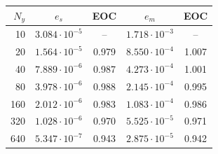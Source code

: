 \begin{tabular}{rcccc}
\toprule
$N_y$ & $e_s$ & EOC & $e_m$ & EOC \\
\midrule
10 & $3.084 \cdot 10^{-5}$ & -- & $1.718 \cdot 10^{-3}$ & -- \\
20 & $1.564 \cdot 10^{-5}$ & 0.979 & $8.550 \cdot 10^{-4}$ & 1.007 \\
40 & $7.889 \cdot 10^{-6}$ & 0.987 & $4.273 \cdot 10^{-4}$ & 1.001 \\
80 & $3.978 \cdot 10^{-6}$ & 0.988 & $2.145 \cdot 10^{-4}$ & 0.995 \\
160 & $2.012 \cdot 10^{-6}$ & 0.983 & $1.083 \cdot 10^{-4}$ & 0.986 \\
320 & $1.028 \cdot 10^{-6}$ & 0.970 & $5.525 \cdot 10^{-5}$ & 0.971 \\
640 & $5.347 \cdot 10^{-7}$ & 0.943 & $2.875 \cdot 10^{-5}$ & 0.942 \\
\bottomrule
\end{tabular}
